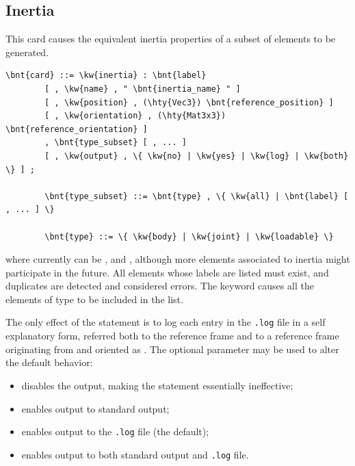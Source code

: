 \subsection{Inertia}\label{sec:EL:MISC:INERTIA}
This card causes the equivalent inertia properties of a subset
of elements to be generated.
\begin{Verbatim}[commandchars=\\\{\}]
    \bnt{card} ::= \kw{inertia} : \bnt{label}
        [ , \kw{name} , " \bnt{inertia_name} " ]
        [ , \kw{position} , (\hty{Vec3}) \bnt{reference_position} ]
        [ , \kw{orientation} , (\hty{Mat3x3}) \bnt{reference_orientation} ]
        , \bnt{type_subset} [ , ... ]
        [ , \kw{output} , \{ \kw{no} | \kw{yes} | \kw{log} | \kw{both} \} ] ;

        \bnt{type_subset} ::= \bnt{type} , \{ \kw{all} | \bnt{label} [ , ... ] \}

        \bnt{type} ::= \{ \kw{body} | \kw{joint} | \kw{loadable} \}
\end{Verbatim}
where  currently can be ,  and , 
although more elements associated to inertia might participate in the future.
All elements whose labels are listed must exist, and duplicates
are detected and considered errors.
The keyword  causes all the elements of type  
to be included in the list.

\noindent
The only effect of the  statement is to log
each  entry in the \texttt{.log} file in a self explanatory form,
referred both to the  reference frame and to a reference frame
originating from  and oriented 
as .
The optional parameter  may be used to alter the default 
behavior:
\begin{itemize}
\item {} disables the output, making the  
statement essentially ineffective;
\item {} enables output to standard output;
\item {} enables output to the \texttt{.log} file (the default);
\item {} enables output to both standard output and \texttt{.log} file.
\end{itemize}



